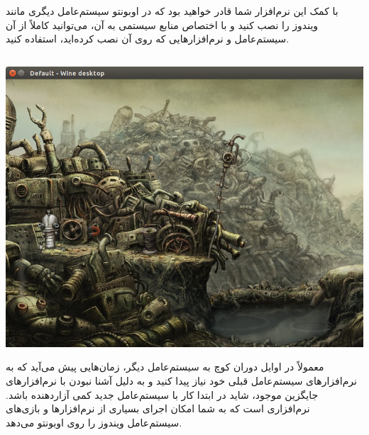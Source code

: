 با کمک این نرم‌افزار شما قادر خواهید بود که در اوبونتو سیستم‌عامل دیگری مانند ویندوز را نصب کنید و با اختصاص منابع سیستمی به آن، می‌توانید کاملاً از آن سیستم‌عامل و نرم‌افزارهایی که روی آن نصب کرده‌اید، استفاده کنید.

\subsection[Wine]{}

\begin{center}
\includegraphics[scale=0.4]{pics/47.png}
\end{center}

معمولاً در اوایل دوران کوچ به سیستم‌عامل دیگر، زمان‌هایی پیش می‌آید که به نرم‌افزارهای سیستم‌عامل قبلی خود نیاز پیدا کنید و به دلیل آشنا نبودن با نرم‌افزارهای جایگزین موجود، شاید در ابتدا کار با سیستم‌عامل جدید کمی آزار‌دهنده باشد.  نرم‌افزاری است که به شما امکان اجرای بسیاری از نرم‌افزارها و بازی‌های سیستم‌عامل ویندوز را روی اوبونتو می‌دهد.

\subsection[Goldendict]{}

